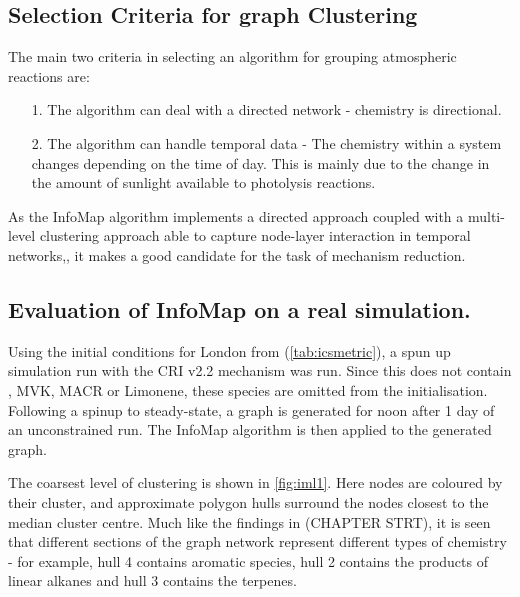 \subsection{Selection Criteria for graph Clustering}

The main two criteria in selecting an algorithm for grouping atmospheric reactions are:

\begin{itemize}
    \item[1.] The algorithm can deal with a directed network - chemistry is directional.
    \item[2.] The algorithm can handle temporal data - The chemistry within a system changes depending on the time of day. This is mainly due to the change in the amount of sunlight available to photolysis reactions. 
\end{itemize}

As the InfoMap algorithm implements a directed approach coupled with a multi-level clustering approach able to capture node-layer interaction in temporal networks,\citep{infointermittent}, it makes a good candidate for the task of mechanism reduction. 

\subsection{Evaluation of InfoMap on a real simulation.}

Using the initial conditions for London from (\autoref{tab:icsmetric}), a spun up simulation run with the CRI v2.2 mechanism was run. Since this does not contain , MVK, MACR or Limonene, these species are omitted from the initialisation. Following a spinup to steady-state, a graph is generated for noon after 1 day of an unconstrained run. The InfoMap algorithm is then applied to the generated graph.

The coarsest level of clustering is shown in \autoref{fig:iml1}. Here nodes are coloured by their cluster, and approximate polygon hulls surround the nodes closest to the median cluster centre. Much like the findings in (CHAPTER STRT), it is seen that different sections of the graph network represent different types of chemistry - for example, hull 4 contains aromatic species, hull 2 contains the products of linear alkanes and hull 3 contains the terpenes.


